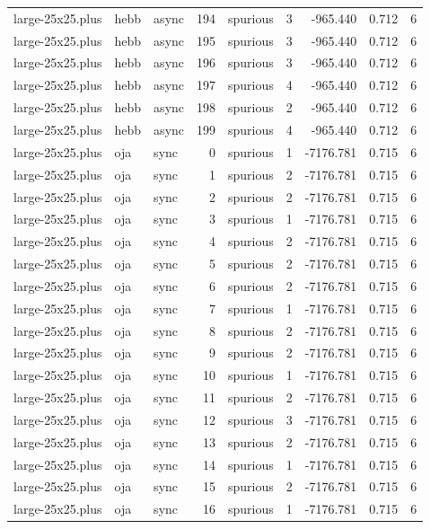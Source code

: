 \begin{tabular}{lllrlrrrr}
large-25x25.plus & hebb & async & 194 & spurious & 3 & -965.440 & 0.712 & 6 \\
large-25x25.plus & hebb & async & 195 & spurious & 3 & -965.440 & 0.712 & 6 \\
large-25x25.plus & hebb & async & 196 & spurious & 3 & -965.440 & 0.712 & 6 \\
large-25x25.plus & hebb & async & 197 & spurious & 4 & -965.440 & 0.712 & 6 \\
large-25x25.plus & hebb & async & 198 & spurious & 2 & -965.440 & 0.712 & 6 \\
large-25x25.plus & hebb & async & 199 & spurious & 4 & -965.440 & 0.712 & 6 \\
large-25x25.plus & oja & sync & 0 & spurious & 1 & -7176.781 & 0.715 & 6 \\
large-25x25.plus & oja & sync & 1 & spurious & 2 & -7176.781 & 0.715 & 6 \\
large-25x25.plus & oja & sync & 2 & spurious & 2 & -7176.781 & 0.715 & 6 \\
large-25x25.plus & oja & sync & 3 & spurious & 1 & -7176.781 & 0.715 & 6 \\
large-25x25.plus & oja & sync & 4 & spurious & 2 & -7176.781 & 0.715 & 6 \\
large-25x25.plus & oja & sync & 5 & spurious & 2 & -7176.781 & 0.715 & 6 \\
large-25x25.plus & oja & sync & 6 & spurious & 2 & -7176.781 & 0.715 & 6 \\
large-25x25.plus & oja & sync & 7 & spurious & 1 & -7176.781 & 0.715 & 6 \\
large-25x25.plus & oja & sync & 8 & spurious & 2 & -7176.781 & 0.715 & 6 \\
large-25x25.plus & oja & sync & 9 & spurious & 2 & -7176.781 & 0.715 & 6 \\
large-25x25.plus & oja & sync & 10 & spurious & 1 & -7176.781 & 0.715 & 6 \\
large-25x25.plus & oja & sync & 11 & spurious & 2 & -7176.781 & 0.715 & 6 \\
large-25x25.plus & oja & sync & 12 & spurious & 3 & -7176.781 & 0.715 & 6 \\
large-25x25.plus & oja & sync & 13 & spurious & 2 & -7176.781 & 0.715 & 6 \\
large-25x25.plus & oja & sync & 14 & spurious & 1 & -7176.781 & 0.715 & 6 \\
large-25x25.plus & oja & sync & 15 & spurious & 2 & -7176.781 & 0.715 & 6 \\
large-25x25.plus & oja & sync & 16 & spurious & 1 & -7176.781 & 0.715 & 6 \\

\end{tabular}
